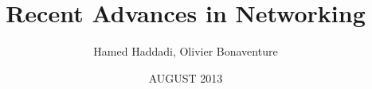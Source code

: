 \documentclass{book}
\title{Recent Advances in Networking}
\author{
Hamed Haddadi,  Olivier Bonaventure\\
}
\begin{document}
\date{AUGUST 2013}

\maketitle



\newpage



\newpage



\newpage



\newpage














\end{document}
